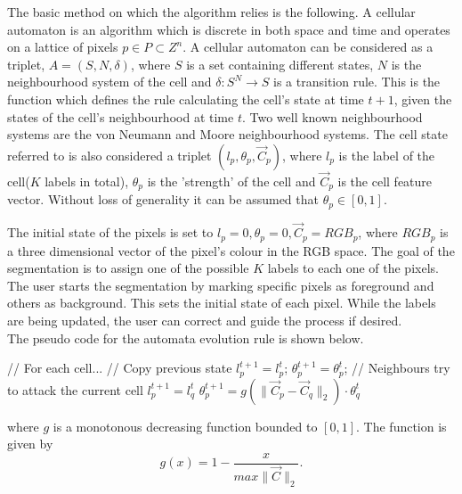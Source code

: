 \documentclass[a4paper,10pt]{article}
\begin{document}
\noindent The basic method on which the algorithm relies is the following.  A cellular automaton is an algorithm which is discrete in both space and time and operates on a 
lattice of pixels $p \in P \subset Z^{n}$.  A cellular automaton can be considered as a triplet, $A = (S, N, \delta)$, where $S$ is a set containing different states, $N$ is the
neighbourhood system of the cell and $\delta: S^{N} \rightarrow S $ is a transition rule.  This is the function which defines  the rule calculating the cell's state at time $t + 1$, given the states 
of the cell's neighbourhood at time $t$.  Two well known neighbourhood systems are the von Neumann and Moore neighbourhood systems.  The cell state referred to is also
considered a triplet $(l_{p}, \theta_{p}, \overrightarrow{C}_{p})$, where $l_{p}$ is the label of the cell($K$ labels in total), $\theta_{p}$ is the 'strength' of the cell and $\overrightarrow{C}_{p}$ is
the cell feature vector.  Without loss of generality it can be assumed that $\theta_{p} \in [0,1]$. 

The initial state of the pixels is set to $l_{p} = 0, \theta_{p} = 0, \overrightarrow{C}_{p} = RGB_{p}$, where $RGB_{p}$ is a three dimensional vector of the pixel's colour in 
the RGB space.  The goal of the segmentation is to assign one of the possible $K$ labels to each one of the pixels.  The user starts the segmentation by marking specific pixels as
foreground and others as background.  This sets the initial state of each pixel.  While the labels are being updated, the user can correct and guide the process if desired.  \\

\newpage
\noindent The pseudo code for the automata evolution rule is shown below. 
\begin{algorithm}[H]
\begin{algorithmic}[1]
 \State // For each cell...
 \State // Copy previous state
 \State $l^{t+1}_{p} = l^{t}_{p}$;
 \State $\theta_{p}^{t+1} = \theta_{p}^{t}$;
 \State // Neighbours try to attack the current cell
 \State $l^{t+1}_{p} = l^{t}_{q}$
 \State $\theta^{t+1}_{p} = g(\| \overrightarrow{C}_{p} - \overrightarrow{C}_{q} \|_{2}) \cdot \theta^{t}_{q}$
 \EndIf
 \EndFor
 \EndFor
\end{algorithmic}
\end{algorithm}

\noindent where $g$ is a monotonous decreasing function bounded to $[0, 1]$.  The function is given by
\[
g(x) = 1 - \frac{x}{max\| \overrightarrow{C} \|_{2}}. 
\]
\end{document}
